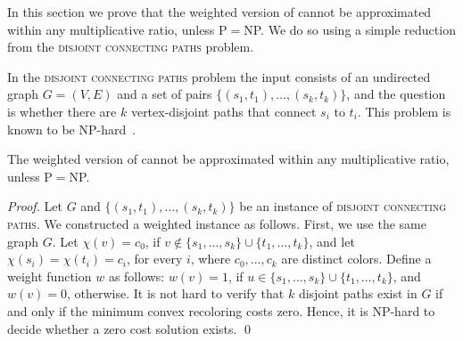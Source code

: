 \label{sec:hard}

In this section we prove that the weighted version of \TWOCR{} cannot
be approximated within any multiplicative ratio, unless P$=$NP.  We
do so using a simple reduction from the 
\textsc{disjoint connecting paths} problem.

In the \textsc{disjoint connecting paths} problem the input consists
of an undirected graph $G=(V,E)$ and a set of pairs $\{(s_1,
t_1), \ldots, (s_k, t_k)\}$, and the question is whether there are $k$
vertex-disjoint paths that connect $s_i$ to $t_i$.  This problem is
known to be NP-hard~\cite{karp1972reducibility}.

\begin{theorem}
The weighted version of \TWOCR{} cannot be approximated within any
 multiplicative ratio, unless P$=$NP.
\end{theorem}
\begin{proof}
Let $G$ and $\{(s_1, t_1), \ldots, (s_k, t_k)\}$ be an instance
of \textsc{disjoint connecting paths}.  We constructed a
weighted \TWOCR{} instance as follows.  First, we use the same graph
$G$.  Let $\chi(v) = c_0$, if
$v \not\in \{s_1,\ldots,s_k\} \cup \{t_1,\ldots,t_k\}$, and let
$\chi(s_i) = \chi(t_i) = c_i$, for every $i$, where $c_0, \ldots, c_k$
are distinct colors.
%
Define a weight function $w$ as follows: $w(v) = 1$, if
$u \in \{s_1,\ldots,s_k\} \cup \{t_1,\ldots,t_k\}$, and $w(v) = 0$,
otherwise.
%
It is not hard to verify that $k$ disjoint paths exist in $G$ if and
only if the minimum convex recoloring costs zero.  Hence, it is
NP-hard to decide whether a zero cost solution exists.
\qed
\end{proof}
